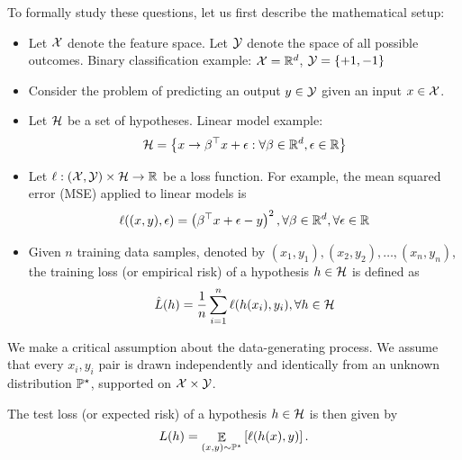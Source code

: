 To formally study these questions, let us first describe the mathematical setup:
\begin{itemize}
    \item Let $\mathcal{X}$ denote the feature space. Let $\mathcal{Y}$ denote the space of all possible outcomes. Binary classification example: $\mathcal{X}=\mathbb{R}^d$, $\mathcal{Y}=\left\{+1,-1\right\}$
    
    \item Consider the problem of predicting an output $y \in \mathcal{Y}$ given an input $x\in\mathcal{X}$.

    \item Let $\mathcal{H}$ be a set of hypotheses. Linear model example: \[ \mathcal{H} = \left\{x \rightarrow \beta^{\top} x + \epsilon: \forall \beta \in \mathbb{R}^d, \epsilon\in\mathbb{R}\right\} \]

    \item Let $\ell: (\mathcal{X}, \mathcal{Y}) \times \mathcal{H} \rightarrow \mathbb{R}$ be a loss function. For example, the mean squared error (MSE) applied to linear models is
    \[ \ell((x, y), \epsilon) = \left(\beta^{\top}x + \epsilon - y\right)^2, \forall \beta\in\mathbb{R}^d, \forall\epsilon\in\mathbb{R} \]

    \item Given $n$ training data samples, denoted by $(x_1, y_1), (x_2, y_2), \dots, (x_n, y_n)$, the training loss (or empirical risk) of a hypothesis $h\in\mathcal{H}$ is defined as
    \begin{align}
        \hat L(h) = \frac 1 n \sum_{i=1}^n \ell(h(x_i), y_i), \forall h \in \mathcal{H}
    \end{align}
\end{itemize}

We make a critical assumption about the data-generating process. We assume that every $x_i, y_i$ pair is drawn independently and identically from an unknown distribution $\mathbb{P}^{\star}$, supported on $\mathcal{X} \times \mathcal{Y}$.

The test loss (or expected risk) of a hypothesis $h\in\mathcal{H}$ is then given by
\begin{align}
    L(h) = \mathop{\mathbb{E}}_{(x, y)\sim\mathbb{P}^{\star}}\left[ \ell(h(x), y) \right].
\end{align}

